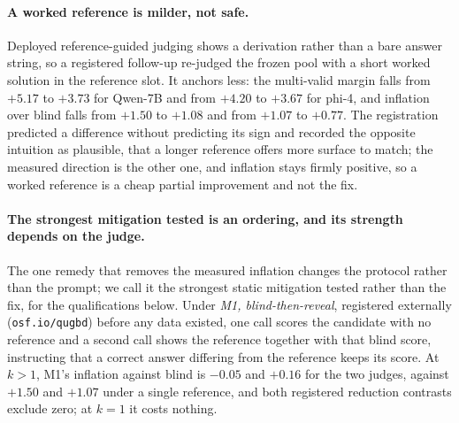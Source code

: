 \documentclass[11pt]{article}
\begin{document}
\paragraph{A worked reference is milder, not safe.}
Deployed reference-guided judging shows a derivation rather than a bare answer string, so a registered follow-up re-judged the frozen pool with a short worked solution in the reference slot.
It anchors less: the multi-valid margin falls from $+5.17$ to $+3.73$ for Qwen-7B and from $+4.20$ to $+3.67$ for phi-4, and inflation over blind falls from $+1.50$ to $+1.08$ and from $+1.07$ to $+0.77$.
The registration predicted a difference without predicting its sign and recorded the opposite intuition as plausible, that a longer reference offers more surface to match; the measured direction is the other one, and inflation stays firmly positive, so a worked reference is a cheap partial improvement and not the fix.

\paragraph{The strongest mitigation tested is an ordering, and its strength depends on the judge.}
The one remedy that removes the measured inflation changes the protocol rather than the prompt; we call it the strongest static mitigation tested rather than the fix, for the qualifications below.
Under \emph{M1, blind-then-reveal}, registered externally (\texttt{osf.io/qugbd}) before any data existed, one call scores the candidate with no reference and a second call shows the reference together with that blind score, instructing that a correct answer differing from the reference keeps its score.
At $k>1$, M1's inflation against blind is $-0.05$ and $+0.16$ for the two judges, against $+1.50$ and $+1.07$ under a single reference, and both registered reduction contrasts exclude zero; at $k{=}1$ it costs nothing.
\end{document}
